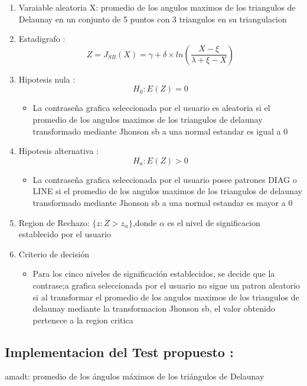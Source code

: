 \documentclass[12pt]{report}
\begin{document}
\begin{enumerate}
	\item Varaiable aleatoria X: promedio de los angulos maximos de los triangulos de Delaunay en un conjunto de 5 puntos con 3 triangulos en su triangulacion
	\item Estadigrafo : \[
	Z= J_{SB}(X) =  \gamma + \delta \times ln\left(\frac{X - \xi}{\lambda + \xi - X}\right)
	\]

	\item Hipotesis nula : \[H_0:E(Z)=0\]
	\begin{itemize}
		\item La contraseña grafica seleccionada por el usuario es aleatoria si el promedio de los angulos maximos de los triangulos de delaunay  transformado mediante Jhonson sb a una normal estandar es igual a 0
	\end{itemize}
	
	
	\item Hipotesis alternativa : \[H_a:E(Z)>0\]
			\begin{itemize}
			\item La contraseña grafica seleccionada por el usuario posee patrones DIAG o LINE  si el promedio de los angulos maximos de los triangulos de delaunay  transformado mediante Jhonson sb a una normal estandar es mayor a 0
		\end{itemize}
	
	\item  Region de Rechazo: $\{z:Z>z_\alpha\}$,donde $\alpha$ es el nivel de significacion establecido por el usuario 
	
	\item Criterio de decisión
	\begin{itemize}
		\item Para los cinco niveles de significación establecidos, se decide que la contrase;a grafica seleccionada por el usuario no sigue un patron aleatorio si al transformar el promedio de los angulos maximos de los triangulos de delaunay mediante la transformacion Jhonson sb, el valor obtenido pertenece a la region critica 
	\end{itemize}
	\end{enumerate}	 

\subsection{Implementacion del Test propuesto :}
	amadt: promedio de los ángulos máximos de los triángulos de Delaunay
	 
\end{document}
